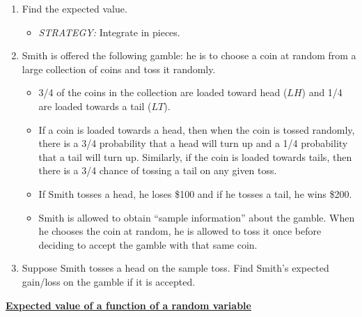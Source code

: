 \documentclass{article}
\newcommand{\bu}[1]{\textbf{\ul{#1}}}				%
\begin{document}
\begin{itemize}
\begin{enumerate}
\[\begin{array}{ll}
                560x & 0 \le x \le 0.05\\
                -15x + 3.75 & 0.05 < x \le 0.25\\
                0 & \text{otherwise}\\
            \end{array}
            \right.
        \]
        \item[] Find the expected value.
        \begin{itemize}
            \item \textit{STRATEGY:} Integrate in pieces.
        \end{itemize}\vspace{90pt}
        \item Smith is offered the following gamble: he is to choose a coin at random from a large collection of coins and toss it randomly.
        \begin{itemize}
            \item 3/4 of the coins in the collection are loaded toward head ($LH$) and 1/4 are loaded towards a tail ($LT$).
            \item If a coin is loaded towards a head, then when the coin is tossed randomly, there is a 3/4 probability that a head will turn up and a 1/4 probability that a tail will turn up. Similarly, if the coin is loaded towards tails, then there is a 3/4 chance of tossing a tail on any given toss.
            \item If Smith tosses a head, he loses \$100 and if he tosses a tail, he wins \$200.
            \item Smith is allowed to obtain ``sample information'' about the gamble. When he chooses the coin at random, he is allowed to toss it once before deciding to accept the gamble with that same coin.
        \end{itemize}
        \item[] Suppose Smith tosses a head on the sample toss. Find Smith's expected gain/loss on the gamble if it is accepted.\vspace{200pt}
    \end{enumerate}
\end{itemize}\bigskip


\bu{Expected value of a function of a random variable}\bigskip
\end{document}
